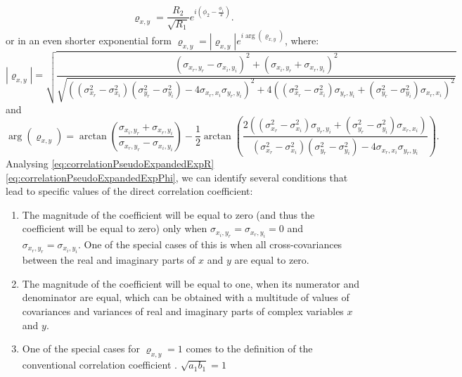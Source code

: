 \documentclass[
]{book}
\begin{document}
\begin{equation}
    {\varrho}_{x,y} = \frac{R_2}{\sqrt{R_1}} e^{i \left(\phi_2 - \frac{\phi_1}{2} \right)}.
    \label{eq:correlationPseudoExpandedExp03}
\end{equation}
or in an even shorter exponential form \({\varrho}_{x,y} = |{\varrho}_{x,y}| e ^{i \arg({\varrho}_{x,y})}\), where:
\begin{equation}
    |{\varrho}_{x,y}|=\sqrt{\frac{(\sigma_{x_r, y_r} - \sigma_{x_i, y_i})^2 +  (\sigma_{x_i, y_r} + \sigma_{x_r, y_i})^2}{\sqrt{\left((\sigma_{x_r}^2 - \sigma_{x_i}^2)(\sigma_{y_r}^2 - \sigma_{y_i}^2) - 4 \sigma_{x_r,x_i} \sigma_{y_r,y_i} \right)^2+ 4 \left( (\sigma_{x_r}^2 - \sigma_{x_i}^2) \sigma_{y_r,y_i} + (\sigma_{y_r}^2 - \sigma_{y_i}^2) \sigma_{x_r,x_i} \right)^2}}}
    \label{eq:correlationPseudoExpandedExpR}
\end{equation}
and
\begin{equation}
    \arg({\varrho}_{x,y}) = \arctan \left( \frac{\sigma_{x_i, y_r} + \sigma_{x_r, y_i}}{\sigma_{x_r, y_r} - \sigma_{x_i, y_i}} \right) - \frac{1}{2}\arctan \left(\frac{2 \left( (\sigma_{x_r}^2 - \sigma_{x_i}^2) \sigma_{y_r,y_i} + (\sigma_{y_r}^2 - \sigma_{y_i}^2) \sigma_{x_r,x_i} \right)}{(\sigma_{x_r}^2 - \sigma_{x_i}^2)(\sigma_{y_r}^2 - \sigma_{y_i}^2) - 4 \sigma_{x_r,x_i} \sigma_{y_r,y_i}}\right) .
    \label{eq:correlationPseudoExpandedExpPhi}
\end{equation}
Analysing \eqref{eq:correlationPseudoExpandedExpR} \eqref{eq:correlationPseudoExpandedExpPhi}, we can identify several conditions that lead to specific values of the direct correlation coefficient:

\begin{enumerate}
\def\labelenumi{\arabic{enumi}.}
\item
  The magnitude of the coefficient will be equal to zero (and thus the coefficient will be equal to zero) only when \(\sigma_{x_i,y_r}=\sigma_{x_r,y_i}=0\) and \(\sigma_{x_r,y_r}=\sigma_{x_i,y_i}\). One of the special cases of this is when all cross-covariances between the real and imaginary parts of \(x\) and \(y\) are equal to zero.
\item
  The magnitude of the coefficient will be equal to one, when its numerator and denominator are equal, which can be obtained with a multitude of values of covariances and variances of real and imaginary parts of complex variables \(x\) and \(y\).
\item
  One of the special cases for \(\varrho_{x,y}=1\) comes to the definition of the conventional correlation coefficient \citep{refPearson}. \(\sqrt{a_1 b_1}=1\)
\end{enumerate}
\end{document}
